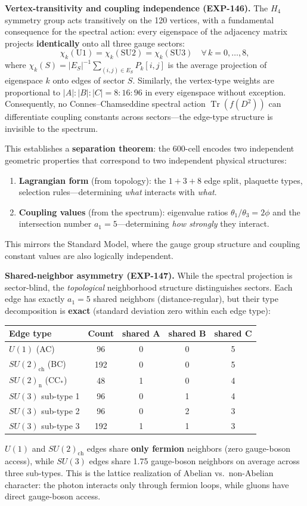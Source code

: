 \documentclass[12pt,a4paper]{article}
\begin{document}
\textbf{Vertex-transitivity and coupling independence (EXP-146).} The $H_4$ symmetry group acts transitively on the 120 vertices, with a fundamental consequence for the spectral action: every eigenspace of the adjacency matrix projects \textbf{identically} onto all three gauge sectors:
\[
\chi_k(\text{U1}) = \chi_k(\text{SU2}) = \chi_k(\text{SU3}) \quad \forall\, k = 0, \ldots, 8,
\]
where $\chi_k(S) = |E_S|^{-1} \sum_{(i,j) \in E_S} P_k[i,j]$ is the average projection of eigenspace $k$ onto edges of sector $S$. Similarly, the vertex-type weights are proportional to $|A|:|B|:|C| = 8:16:96$ in every eigenspace without exception. Consequently, no Connes--Chamseddine spectral action $\operatorname{Tr}(f(D^2))$ can differentiate coupling constants across sectors---the edge-type structure is invisible to the spectrum.

This establishes a \textbf{separation theorem}: the 600-cell encodes two independent geometric properties that correspond to two independent physical structures:
\begin{enumerate}
\item \textbf{Lagrangian form} (from topology): the $1 + 3 + 8$ edge split, plaquette types, selection rules---determining \emph{what} interacts with \emph{what}.
\item \textbf{Coupling values} (from the spectrum): eigenvalue ratios $\theta_1/\theta_3 = 2\phi$ and the intersection number $a_1 = 5$---determining \emph{how strongly} they interact.
\end{enumerate}
This mirrors the Standard Model, where the gauge group structure and coupling constant values are also logically independent.

\textbf{Shared-neighbor asymmetry (EXP-147).} While the spectral projection is sector-blind, the \emph{topological} neighborhood structure distinguishes sectors. Each edge has exactly $a_1 = 5$ shared neighbors (distance-regular), but their type decomposition is \textbf{exact} (standard deviation zero within each edge type):
\begin{center}
\begin{tabular}{lcccc}
\toprule
\textbf{Edge type} & \textbf{Count} & \textbf{shared A} & \textbf{shared B} & \textbf{shared C} \\
\midrule
$U(1)$ (AC) & 96 & 0 & 0 & 5 \\
$SU(2)_{\text{ch}}$ (BC) & 192 & 0 & 0 & 5 \\
$SU(2)_{\text{n}}$ (CC$_*$) & 48 & 1 & 0 & 4 \\
$SU(3)$ sub-type 1 & 96 & 0 & 1 & 4 \\
$SU(3)$ sub-type 2 & 96 & 0 & 2 & 3 \\
$SU(3)$ sub-type 3 & 192 & 1 & 1 & 3 \\
\bottomrule
\end{tabular}
\end{center}
$U(1)$ and $SU(2)_{\text{ch}}$ edges share \textbf{only fermion} neighbors (zero gauge-boson access), while $SU(3)$ edges share 1.75 gauge-boson neighbors on average across three sub-types. This is the lattice realization of Abelian vs.\ non-Abelian character: the photon interacts only through fermion loops, while gluons have direct gauge-boson access.
\end{document}
